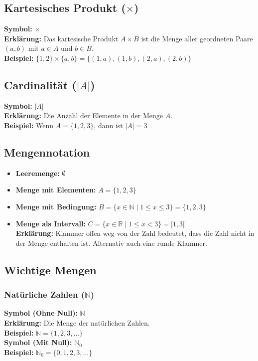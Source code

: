 \documentclass[12pt,a4paper]{article}
\begin{document}
\subsection{Kartesisches Produkt (\texorpdfstring{$\times$}{times})}
\textbf{Symbol:} $\times$ \\
\textbf{Erklärung:} Das kartesische Produkt $A \times B$ ist die Menge aller geordneten Paare $(a,b)$ mit $a \in A$ und $b \in B$. \\
\textbf{Beispiel:} $\{1,2\} \times \{a,b\} = \{(1,a),(1,b),(2,a),(2,b)\}$

\subsection{Cardinalität (\texorpdfstring{$|A|$}{|A|})}
\textbf{Symbol:} $|A|$ \\
\textbf{Erklärung:} Die Anzahl der Elemente in der Menge $A$. \\
\textbf{Beispiel:} Wenn $A = \{1,2,3\}$, dann ist $|A| = 3$

\subsection{Mengennotation}
\begin{itemize}
    \item \textbf{Leeremenge: }$\emptyset$
    \item \textbf{Menge mit Elementen:} $A = \{1,2,3\}$
    \item \textbf{Menge mit Bedingung:} $B = \{x \in \mathbb{N} \mid 1 \leq x \leq 3\} = \{1,2,3\}$
    \item \textbf{Menge als Intervall:} $C = \{x \in \mathbb{R} \mid 1 \leq x < 3\} = [1, 3[$ \\ \textbf{Erklärung:} Klammer offen weg von der Zahl bedeutet, dass die Zahl nicht in der Menge enthalten ist. Alternativ auch eine runde Klammer.
\end{itemize}

\subsection{Wichtige Mengen}

\subsubsection{Natürliche Zahlen (\texorpdfstring{$\mathbb{N}$}{N})}
\textbf{Symbol (Ohne Null):} $\mathbb{N}$ \\
\textbf{Erklärung:} Die Menge der natürlichen Zahlen. \\
\textbf{Beispiel:} $\mathbb{N} = \{1,2,3,\dots\}$ \\
\textbf{Symbol (Mit Null):} $\mathbb{N}_0$ \\
\textbf{Beispiel:} $\mathbb{N}_0 = \{0, 1,2,3,\dots\}$
\end{document}
